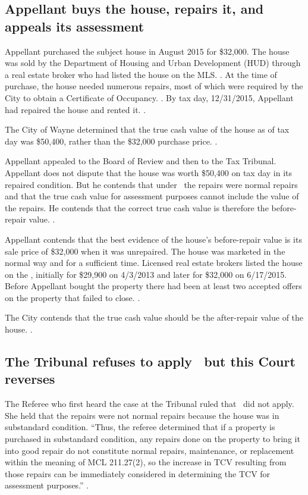 \documentclass[12pt,\documentclassflag]{michiganCourtOfAppealsBrief}
\begin{document}
\subsection{Appellant buys the house, repairs it, and appeals its assessment}

Appellant purchased the subject house in August 2015 for \$32,000. The house was sold by the Department of Housing and Urban Development (HUD) through a real estate broker who had listed the house on the MLS. \mlsListing[]. At the time of purchase, the house needed numerous repairs, most of which were required by the City to obtain a Certificate of Occupancy. \repairs[]. By tax day, 12/31/2015, Appellant had repaired the house and rented it. \foj[4-5].

The City of Wayne determined that the true cash value of the house as of tax day was \$50,400, rather than the \$32,000 purchase price. \boardOfReviewDecision.

Appellant appealed to the Board of Review and then to the Tax Tribunal. Appellant does not dispute that the house was worth \$50,400 on tax day in its repaired condition. But he contends that under \mathieuGast\ the repairs were normal repairs and that the true cash value for assessment purposes cannot include the value of the repairs. He contends that the correct true cash value is therefore the before-repair value. \explanatoryLetter[].

Appellant contends that the best evidence of the house's before-repair value is its sale price of \$32,000 when it was unrepaired. The house was marketed in the normal way and for a sufficient time. Licensed real estate brokers listed the house on the \MLS, initially for \$29,900 on 4/3/2013 and later for \$32,000 on 6/17/2015. Before Appellant bought the property there had been at least two accepted offers on the property that failed to close. \mlsHistory[]. 

The City contends that the true cash value should be the after-repair value of the house. \cityEvidence.

\subsection{The Tribunal refuses to apply \mathieuGast\ but this Court reverses}

The Referee who first heard the case at the Tribunal ruled that \mathieuGast\ did not apply. She held that the repairs were not normal repairs because the house was in substandard condition. ``Thus, the referee determined that if a property is purchased in substandard condition, any repairs done on the property to bring it into good repair do not constitute normal repairs, maintenance, or replacement within the meaning of MCL 211.27(2), so the increase in TCV resulting from those repairs can be immediately considered in determining the TCV for assessment purposes.'' .
\end{document}
